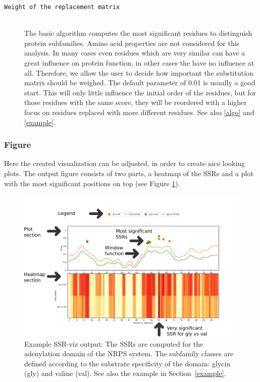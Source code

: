 \documentclass[a4paper,10pt]{article}
\begin{document}
\begin{description}
\item[\texttt{Weight of the replacement matrix}] \hfill \\

The basic algorithm computes the most significant residues to distinguish protein subfamilies. 
Amino acid properties are not considered for this analysis. In many cases
even residues which are very similar can have a great influence on protein function, in other cases
the have no influence at all. Therefore, we allow the user to decide how important the substitution matrix should be
weighed. 
The default parameter of 0.01 is usually a good start. This will only little influence the initial order of the residues,
but for those residues with the same score, they will be reordered with a higher focus on residues replaced with more different residues.
See also \ref{algo} and \ref{example}.

\end{description}

\subsubsection{Figure}

Here the created visualization can be adjusted, in order to create nice looking plots.
The output figure consists of two parts, a heatmap of the SSRs and a plot 
with the most significant positions on top (see Figure \ref{fig:plot_example}).
 
\begin{figure}
  \includegraphics[width=\linewidth]{./figs/plot_example}
  \caption{Example SSR-viz output: The SSRs are computed for the adenylation domain of the NRPS system. 
  The subfamily classes are defined according to the substrate specificity of the domain: glycin (gly) and valine (val).
  See also the example in Section~\ref{example}.}
  \label{fig:plot_example}
\end{figure}
\end{document}
